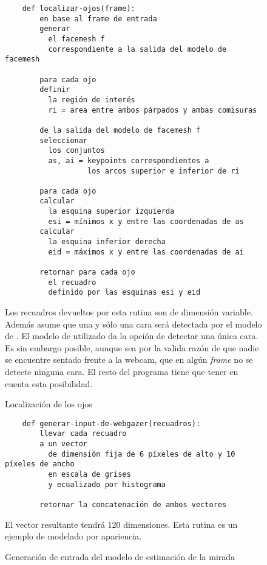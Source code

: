   \begin{figure}
    \centering
    \begin{verbatim}
    def localizar-ojos(frame):
        en base al frame de entrada
        generar
          el facemesh f
          correspondiente a la salida del modelo de facemesh

        para cada ojo
        definir
          la región de interés
          ri = area entre ambos párpados y ambas comisuras
        
        de la salida del modelo de facemesh f
        seleccionar
          los conjuntos
          as, ai = keypoints correspondientes a
                   los arcos superior e inferior de ri
        
        para cada ojo
        calcular
          la esquina superior izquierda
          esi = mínimos x y entre las coordenadas de as
        calcular
          la esquina inferior derecha
          eid = máximos x y entre las coordenadas de ai
      
        retornar para cada ojo
          el recuadro
          definido por las esquinas esi y eid\end{verbatim}

    Los recuadros devueltos por esta rutina son de dimensión variable.
    Además asume que una y sólo una cara será detectada por el modelo de
    \facemesh.
    El modelo de \tfjs utilizado da la opción de detectar una única cara.
    Es sin embargo posible, aunque sea por la valida razón de que nadie se
    encuentre sentado frente a la webcam, que en algún \textit{frame} no se
    detecte ninguna cara.
    El resto del programa tiene que tener en cuenta esta posibilidad.
    \caption{Localización de los ojos}
    \label{fig:eyes-localization}
  \end{figure}

  \begin{figure}
    \begin{verbatim}
    def generar-input-de-webgazer(recuadros):
        llevar cada recuadro
        a un vector
          de dimensión fija de 6 píxeles de alto y 10 píxeles de ancho
          en escala de grises
          y ecualizado por histograma

        retornar la concatenación de ambos vectores\end{verbatim}
    El vector resultante tendrá 120 dimensiones.
    Esta rutina es un ejemplo de modelado por apariencia.
    \caption{Generación de entrada del modelo de estimación de la mirada}
    \label{fig:eye-features-to-model-input}
  \end{figure}

